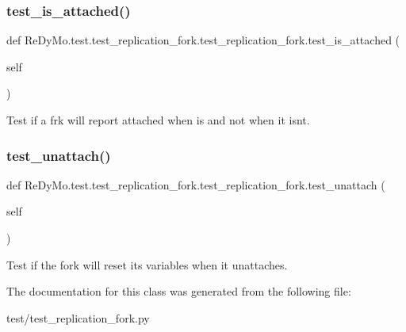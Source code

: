 \subsubsection{\texorpdfstring{test\+\_\+is\+\_\+attached()}{test\_is\_attached()}}
{\footnotesize\ttfamily def Re\+Dy\+Mo.\+test.\+test\+\_\+replication\+\_\+fork.\+test\+\_\+replication\+\_\+fork.\+test\+\_\+is\+\_\+attached (\begin{DoxyParamCaption}\item[{}]{self }\end{DoxyParamCaption})}



Test if a frk will report attached when is and not when it isn\textquotesingle{}t. 

\mbox{\label{classReDyMo_1_1test_1_1test__replication__fork_1_1test__replication__fork_a47ebd7572d932a0ac473c2c4e3b67d43}} 
\subsubsection{\texorpdfstring{test\+\_\+unattach()}{test\_unattach()}}
{\footnotesize\ttfamily def Re\+Dy\+Mo.\+test.\+test\+\_\+replication\+\_\+fork.\+test\+\_\+replication\+\_\+fork.\+test\+\_\+unattach (\begin{DoxyParamCaption}\item[{}]{self }\end{DoxyParamCaption})}



Test if the fork will reset its variables when it unattaches. 



The documentation for this class was generated from the following file\+:\begin{DoxyCompactItemize}
\item 
test/test\+\_\+replication\+\_\+fork.\+py\end{DoxyCompactItemize}
